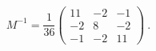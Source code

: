 \begin{equation}
M^{-1}=\frac{1}{36}\left( 
\begin{array}{ccc}
11 & -2 & -1 \\ 
-2 & 8 & -2 \\ 
-1 & -2 & 11%
\end{array}
\right) ~.
\end{equation}


